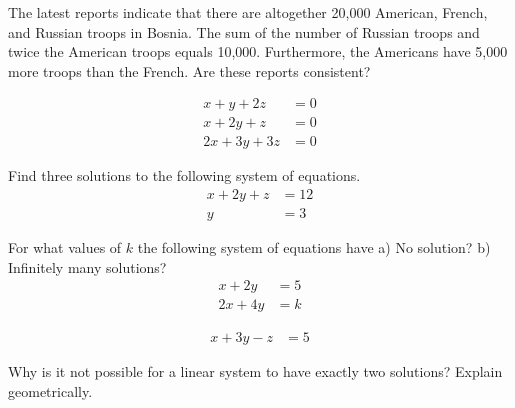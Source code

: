 \begin{puzzle}
    The latest reports indicate that there are altogether 20,000 American, French, and Russian troops in Bosnia. The sum of the number of Russian troops and twice the American troops equals 10,000. Furthermore, the Americans have 5,000 more troops than the French. Are these reports consistent?
\end{puzzle}

\begin{puzzle}
    \begin{align*}
        x + y + 2z   & = 0 \\
        x + 2y + z   & = 0 \\
        2x + 3y + 3z & = 0
    \end{align*}
\end{puzzle}

\begin{puzzle}
    Find three solutions to the following system of equations.
    \begin{align*}
        x + 2y + z & = 12 \\
        y          & = 3
    \end{align*}
\end{puzzle}

\begin{puzzle}
    For what values of \( k \) the following system of equations have a) No solution? b) Infinitely many solutions?
    \begin{align*}
        x + 2y  & = 5 \\
        2x + 4y & = k
    \end{align*}
\end{puzzle}

\begin{puzzle}
    \begin{align*}
        x + 3y - z & = 5
    \end{align*}
\end{puzzle}

\begin{puzzle}
    Why is it not possible for a linear system to have exactly two solutions? Explain geometrically.
\end{puzzle}